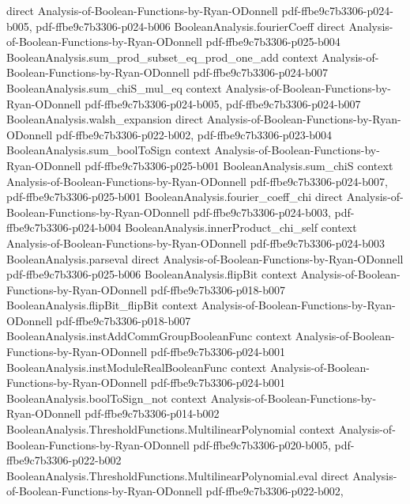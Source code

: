 \begin{lemma}
  {direct}
  {Analysis-of-Boolean-Functions-by-Ryan-ODonnell}
  {pdf-ffbe9c7b3306-p024-b005,
    pdf-ffbe9c7b3306-p024-b006}
\proofstep
  {BooleanAnalysis.fourierCoeff}
  {direct}
  {Analysis-of-Boolean-Functions-by-Ryan-ODonnell}
  {pdf-ffbe9c7b3306-p025-b004}
\proofstep
  {BooleanAnalysis.sum_prod_subset_eq_prod_one_add}
  {context}
  {Analysis-of-Boolean-Functions-by-Ryan-ODonnell}
  {pdf-ffbe9c7b3306-p024-b007}
\proofstep
  {BooleanAnalysis.sum_chiS_mul_eq}
  {context}
  {Analysis-of-Boolean-Functions-by-Ryan-ODonnell}
  {pdf-ffbe9c7b3306-p024-b005,
    pdf-ffbe9c7b3306-p024-b007}
\proofstep
  {BooleanAnalysis.walsh_expansion}
  {direct}
  {Analysis-of-Boolean-Functions-by-Ryan-ODonnell}
  {pdf-ffbe9c7b3306-p022-b002,
    pdf-ffbe9c7b3306-p023-b004}
\proofstep
  {BooleanAnalysis.sum_boolToSign}
  {context}
  {Analysis-of-Boolean-Functions-by-Ryan-ODonnell}
  {pdf-ffbe9c7b3306-p025-b001}
\proofstep
  {BooleanAnalysis.sum_chiS}
  {context}
  {Analysis-of-Boolean-Functions-by-Ryan-ODonnell}
  {pdf-ffbe9c7b3306-p024-b007,
    pdf-ffbe9c7b3306-p025-b001}
\proofstep
  {BooleanAnalysis.fourier_coeff_chi}
  {direct}
  {Analysis-of-Boolean-Functions-by-Ryan-ODonnell}
  {pdf-ffbe9c7b3306-p024-b003,
    pdf-ffbe9c7b3306-p024-b004}
\proofstep
  {BooleanAnalysis.innerProduct_chi_self}
  {context}
  {Analysis-of-Boolean-Functions-by-Ryan-ODonnell}
  {pdf-ffbe9c7b3306-p024-b003}
\proofstep
  {BooleanAnalysis.parseval}
  {direct}
  {Analysis-of-Boolean-Functions-by-Ryan-ODonnell}
  {pdf-ffbe9c7b3306-p025-b006}
\proofstep
  {BooleanAnalysis.flipBit}
  {context}
  {Analysis-of-Boolean-Functions-by-Ryan-ODonnell}
  {pdf-ffbe9c7b3306-p018-b007}
\proofstep
  {BooleanAnalysis.flipBit_flipBit}
  {context}
  {Analysis-of-Boolean-Functions-by-Ryan-ODonnell}
  {pdf-ffbe9c7b3306-p018-b007}
\proofstep
  {BooleanAnalysis.instAddCommGroupBooleanFunc}
  {context}
  {Analysis-of-Boolean-Functions-by-Ryan-ODonnell}
  {pdf-ffbe9c7b3306-p024-b001}
\proofstep
  {BooleanAnalysis.instModuleRealBooleanFunc}
  {context}
  {Analysis-of-Boolean-Functions-by-Ryan-ODonnell}
  {pdf-ffbe9c7b3306-p024-b001}
\proofstep
  {BooleanAnalysis.boolToSign_not}
  {context}
  {Analysis-of-Boolean-Functions-by-Ryan-ODonnell}
  {pdf-ffbe9c7b3306-p014-b002}
\proofstep
  {BooleanAnalysis.ThresholdFunctions.MultilinearPolynomial}
  {context}
  {Analysis-of-Boolean-Functions-by-Ryan-ODonnell}
  {pdf-ffbe9c7b3306-p020-b005,
    pdf-ffbe9c7b3306-p022-b002}
\proofstep
  {BooleanAnalysis.ThresholdFunctions.MultilinearPolynomial.eval}
  {direct}
  {Analysis-of-Boolean-Functions-by-Ryan-ODonnell}
  {pdf-ffbe9c7b3306-p022-b002,
}
\end{lemma}
